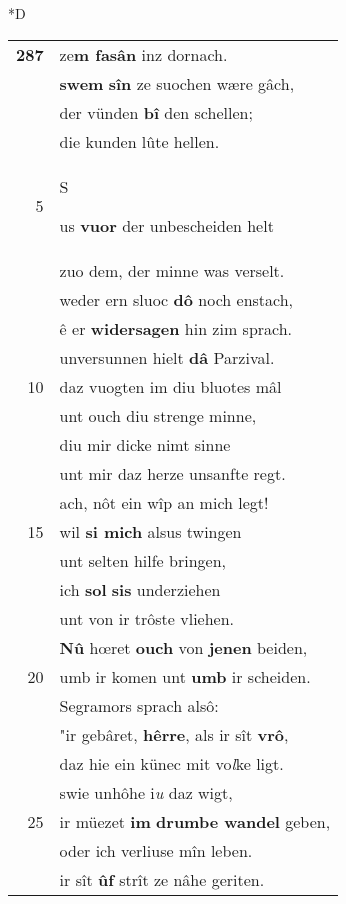 \documentclass[8pt,a4paper,notitlepage]{article}
\begin{document}
\begin{table}[ht]
\begin{minipage}[t]{0.5\linewidth}
\small
\begin{center}*D
\end{center}
\begin{tabular}{rl}
\textbf{287} & ze\textbf{m fasân} inz dornach.\\ 
 & \textbf{swem} \textbf{sîn} ze suochen wære gâch,\\ 
 & der vünden \textbf{bî} den schellen;\\ 
 & die kunden lûte hellen.\\ 
5 & \begin{large}S\end{large}us \textbf{vuor} der unbescheiden helt\\ 
 & zuo dem, der minne was verselt.\\ 
 & weder ern sluoc \textbf{dô} noch enstach,\\ 
 & ê er \textbf{widersagen} hin zim sprach.\\ 
 & unversunnen hielt \textbf{dâ} Parzival.\\ 
10 & daz vuogten im diu bluotes mâl\\ 
 & unt ouch diu strenge minne,\\ 
 & diu mir dicke nimt sinne\\ 
 & unt mir daz herze unsanfte regt.\\ 
 & ach, nôt ein wîp an mich legt!\\ 
15 & wil \textbf{si mich} alsus twingen\\ 
 & unt selten hilfe bringen,\\ 
 & ich \textbf{sol} \textbf{sis} underziehen\\ 
 & unt von ir trôste vliehen.\\ 
 & \textbf{Nû} hœret \textbf{ouch} von \textbf{jenen} beiden,\\ 
20 & umb ir komen unt \textbf{umb} ir scheiden.\\ 
 & Segramors sprach alsô:\\ 
 & "ir gebâret, \textbf{hêrre}, als ir sît \textbf{vrô},\\ 
 & daz hie ein künec mit vo\textit{l}ke ligt.\\ 
 & swie unhôhe i\textit{u} daz wigt,\\ 
25 & ir müezet \textbf{im} \textbf{drumbe wandel} geben,\\ 
 & oder ich verliuse mîn leben.\\ 
 & ir sît \textbf{ûf} strît ze nâhe geriten.\\ 

\end{tabular}
\end{minipage}
\end{table}
\end{document}
